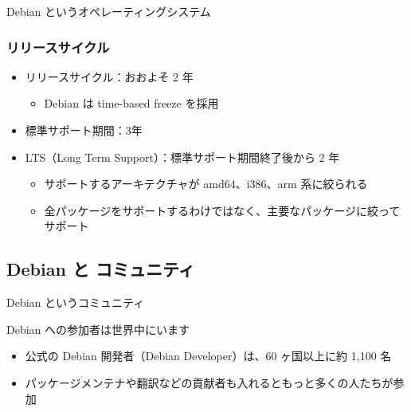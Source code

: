 \begin{frame}{Debian というオペレーティングシステム}

\frametitle{リリースサイクル}
\begin{itemize}
\item リリースサイクル：おおよそ 2 年
  \begin{itemize}
  \item Debian は time-based freeze を採用
  \end{itemize}
\item 標準サポート期間：3年
\item LTS（Long Term Support）：標準サポート期間終了後から 2 年
  \begin{itemize}
  \item サポートするアーキテクチャが amd64、i386、arm 系に絞られる
  \item 全パッケージをサポートするわけではなく、主要なパッケージに絞ってサポート
  \end{itemize}
\end{itemize}

\end{frame}


\subsection{Debian と コミュニティ}

\begin{frame}{Debian というコミュニティ}

Debian への参加者は世界中にいます

\begin{itemize}
\item 公式の Debian 開発者（Debian Developer）は、60 ヶ国以上に約 1,100 名
\item パッケージメンテナや翻訳などの貢献者も入れるともっと多くの人たちが参加
\end{itemize}
  
\end{frame}


